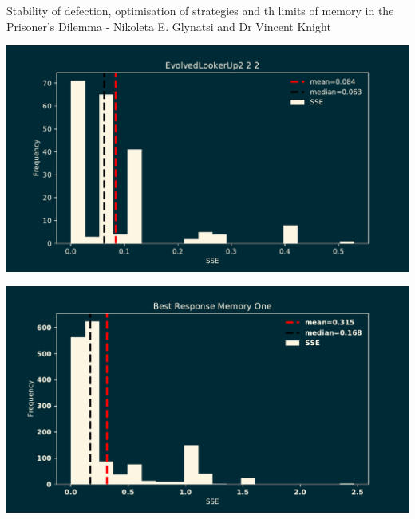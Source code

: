 \documentclass{beamer}
\begin{document}
\begin{frame}
    \begin{center}

        \normalsize{Stability of defection, optimisation of strategies and th
        limits of memory in the Prisoner's Dilemma - Nikoleta E. Glynatsi and
        Dr Vincent Knight}
        
        \vspace{.5cm}
        
    \end{center}
\end{frame}

\begin{frame}
    \begin{center}
        \includegraphics[width=\textwidth]{static/sse_top_strategy}
    \end{center}
\end{frame}

\begin{frame}
    \begin{center}
        \includegraphics[width=\textwidth]{static/result_best_response}
    \end{center}
\end{frame}
\end{document}
